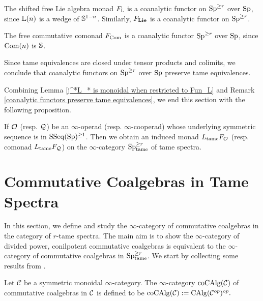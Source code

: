 \begin{example}
	The shifted free Lie algebra monad $F_{{\mathbb{L}}}$ is a coanalytic functor on $\operatorname{Sp}^{\geq r}$ over $\operatorname{Sp}$, since ${\mathbb{L}}(n)$ is a wedge of ${\mathbb{S}}^{1-n}$.
	Similarly, $F_{\mathbf{Lie}}$ is a coanalytic functor on $\operatorname{Sp}^{\geq r}$.
\end{example}

\begin{example}
    The free commutative comonad $F_{\operatorname{Com}}$ is a coanalytic functor
    $\operatorname{Sp}^{\geq r}$ over $\operatorname{Sp}$, since $\operatorname{Com}(n)$ is ${\mathbb{S}}$.
\end{example}

\begin{remark}
\label{coanalytic functors preserve tame equivalences}
	Since tame equivalences are closed under tensor products and colimits,
	we conclude that coanalytic functors on $\operatorname{Sp}^{\geq r}$ over $\operatorname{Sp}$ preserve tame equivalences. 
\end{remark}
Combining Lemma \ref{j^*L_* is monoidal when restricted to Fun_L} and Remark \ref{coanalytic functors preserve tame equivalences}, we end this section with the following proposition.
\begin{proposition}
\label{Induced Monads}
If ${\mathcal{O}}$ (resp. ${\mathcal{Q}}$) be an $\infty$-operad (resp. $\infty$-cooperad) whose underlying symmetric sequence is in $\operatorname{SSeq}(\operatorname{Sp})^{\geq 1}$.
Then we obtain an induced monad $L_{\operatorname{\operatorname{tame}}} F_{{\mathcal{O}}}$ (resp. comonad $L_{\operatorname{\operatorname{tame}}} F_{{\mathcal{Q}}}$) on the $\infty$-category $\operatorname{Sp}^{\geq r}_{\operatorname{\operatorname{tame}}}$ of tame spectra.
\end{proposition}

\section{Commutative Coalgebras in Tame Spectra}
\label{Commutative coalgebras in tame spectra}

In this section, we define and study the $\infty$-category of commutative coalgebras in the category of $r$-tame spectra. 
The main aim is to show the $\infty$-category of divided power, conilpotent commutative coalgebras is equivalent to the $\infty$-category of commutative coalgebras in $\operatorname{Sp}^{\geq r}_{\operatorname{\operatorname{tame}}}$.
We start by collecting some results from \cite{LurieEllipticI}.

\begin{definition}
    Let $\mathcal{C}$ be a symmetric monoidal $\infty$-category. The $\infty$-category $\operatorname{coCAlg}({\mathcal{C}})$ of commutative coalgebras in ${\mathcal{C}}$ is defined to be
    $
    \operatorname{coCAlg}({\mathcal{C}}):= \operatorname{CAlg}({\mathcal{C}}^{op})^{op}.
    $
\end{definition}



